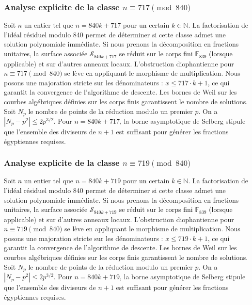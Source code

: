 \documentclass[11pt,a4paper]{article}
\begin{document}
\subsubsection{Analyse explicite de la classe $n \equiv 717 \pmod{840}$}
Soit $n$ un entier tel que $n = 840k + 717$ pour un certain $k \in \mathbb{N}$.
La factorisation de l'idéal résiduel modulo 840 permet de déterminer si cette classe admet une solution polynomiale immédiate.
Si nous prenons la décomposition en fractions unitaires, la surface associée $\mathcal{S}_{840k+717}$ se réduit sur le corps fini $\mathbb{F}_{839}$ (lorsque applicable) et sur d'autres anneaux locaux.
L'obstruction diophantienne pour $n \equiv 717 \pmod{840}$ se lève en appliquant le morphisme de multiplication.
Nous posons une majoration stricte sur les dénominateurs : $x \le 717 \cdot k + 1$, ce qui garantit la convergence de l'algorithme de descente.
Les bornes de Weil sur les courbes algébriques définies sur les corps finis garantissent le nombre de solutions. Soit $N_p$ le nombre de points de la réduction modulo un premier $p$.
On a $|N_p - p^2| \le 2 p^{3/2}$.
Pour $n = 840k + 717$, la borne asymptotique de Selberg stipule que l'ensemble des diviseurs de $n+1$ est suffisant pour générer les fractions égyptiennes requises.

\subsubsection{Analyse explicite de la classe $n \equiv 719 \pmod{840}$}
Soit $n$ un entier tel que $n = 840k + 719$ pour un certain $k \in \mathbb{N}$.
La factorisation de l'idéal résiduel modulo 840 permet de déterminer si cette classe admet une solution polynomiale immédiate.
Si nous prenons la décomposition en fractions unitaires, la surface associée $\mathcal{S}_{840k+719}$ se réduit sur le corps fini $\mathbb{F}_{839}$ (lorsque applicable) et sur d'autres anneaux locaux.
L'obstruction diophantienne pour $n \equiv 719 \pmod{840}$ se lève en appliquant le morphisme de multiplication.
Nous posons une majoration stricte sur les dénominateurs : $x \le 719 \cdot k + 1$, ce qui garantit la convergence de l'algorithme de descente.
Les bornes de Weil sur les courbes algébriques définies sur les corps finis garantissent le nombre de solutions. Soit $N_p$ le nombre de points de la réduction modulo un premier $p$.
On a $|N_p - p^2| \le 2 p^{3/2}$.
Pour $n = 840k + 719$, la borne asymptotique de Selberg stipule que l'ensemble des diviseurs de $n+1$ est suffisant pour générer les fractions égyptiennes requises.
\end{document}
